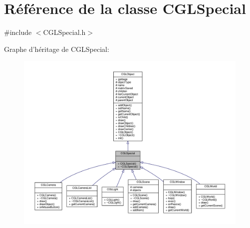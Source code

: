 \hypertarget{class_c_g_l_special}{\section{Référence de la classe C\-G\-L\-Special}
\label{class_c_g_l_special}
}


{\ttfamily \#include $<$C\-G\-L\-Special.\-h$>$}



Graphe d'héritage de C\-G\-L\-Special\-:\nopagebreak
\begin{figure}[H]
\begin{center}
\leavevmode
\includegraphics[width=350pt]{d6/d0c/class_c_g_l_special__inherit__graph}
\end{center}
\end{figure}


